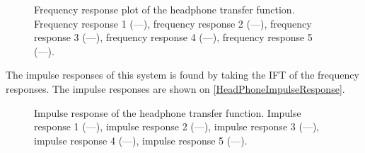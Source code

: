 \begin{figure}[H]
	\centering
	
	\caption{Frequency response plot of the headphone transfer function. Frequency response 1 (\textcolor{MATLABblue}{---}), 
	frequency response 2 (\textcolor{MATLABorange}{---}), 	
	frequency response 3 (\textcolor{MATLAByellow}{---}), 	
	frequency response 4 (\textcolor{MATLABpurple}{---}), 	
	frequency response 5 (\textcolor{MATLABgreen}{---}).}
	\label{HeadPhoneFrequencyResponsePlot}
\end{figure}




The impulse responses of this system is found by taking the IFT of the frequency responses.
The impulse responses are shown on \autoref{HeadPhoneImpulseResponse}.


\begin{figure}[H]
	\centering
	
	\caption{Impulse response of the headphone transfer function. Impulse response 1 (\textcolor{MATLABblue}{---}), 
	impulse response 2 (\textcolor{MATLABorange}{---}), 	
	impulse response 3 (\textcolor{MATLAByellow}{---}), 	
	impulse response 4 (\textcolor{MATLABpurple}{---}), 	
	impulse response 5 (\textcolor{MATLABgreen}{---}).}
	\label{HeadPhoneImpulseResponse}
\end{figure}

%	


% 	

